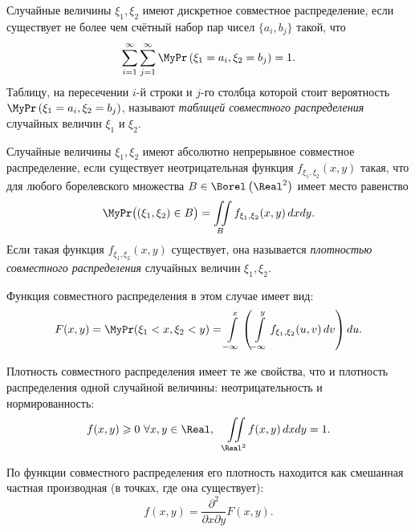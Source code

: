 \begin{defn}
    Случайные величины $\xi_1, \xi_2$ имеют дискретное совместное распределение, если существует не более чем счётный набор пар чисел $\{a_{i}, b_{j}\}$ такой, что
    \begin{equation*}
        \sum\limits_{i=1}^{\infty} \sum\limits_{j=1}^{\infty} \MyPr\left(\xi_{1}=a_{i}, \xi_{2}=b_{j}\right)=1.
    \end{equation*}
    Таблицу, на пересечении $i$-й строки и $j$-го столбца которой стоит вероятность $\MyPr\left(\xi_{1}=a_{i}, \xi_{2}=b_{j}\right)$, называют \textit{таблицей совместного распределения} случайных величин $\xi_1$ и $\xi_2$.
\end{defn}
\begin{defn}
    Случайные величины $\xi_1, \xi_2$ имеют абсолютно непрерывное совместное распределение, если существует неотрицательная функция $f_{\xi_{1}, \xi_{2}}(x, y)$ такая, что для любого борелевского множества $B \in \Borel\left(\Real^{2}\right)$ имеет место равенство
    \begin{equation*}
        \MyPr\bigl(\left(\xi_{1}, \xi_{2}\right) \in B\bigr)=\iint\limits_{B} f_{\xi_{1}, \xi_{2}}(x, y) \, dx dy.
    \end{equation*}
    Если такая функция $f_{\xi_{1}, \xi_{2}}(x, y)$ существует, она называется \textit{плотностью совместного распределения} случайных величин $\xi_1, \xi_2$.
    
    Функция совместного распределения в этом случае имеет вид:
    \begin{equation*}
        F(x, y)=\MyPr(\xi_{1}<x, \xi_{2}<y)=\int\limits_{-\infty}^{x}\left(\int\limits_{-\infty}^{y} f_{\xi_{1}, \xi_{2}}(u, v) \, dv\right) du.
    \end{equation*}
\end{defn}

\begin{rmrk}
    Плотность совместного распределения имеет те же свойства, что и плотность распределения одной случайной величины: неотрицательность и нормированность:
    \begin{equation*}
        f(x, y) \geqslant 0~ \forall x, y \in \Real, \quad \iint\limits_{\Real^{2}} f(x, y) \, dx dy = 1.
    \end{equation*}

    По функции совместного распределения его плотность находится как смешанная частная производная (в точках, где она существует):
    \begin{equation*}
        f(x, y)=\frac{\partial^{2}}{\partial x \partial y} F(x, y).
    \end{equation*}
\end{rmrk}

